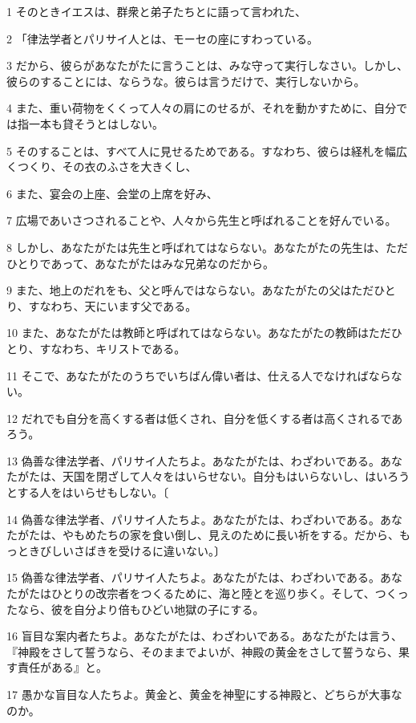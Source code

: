 \par 1 そのときイエスは、群衆と弟子たちとに語って言われた、
\par 2 「律法学者とパリサイ人とは、モーセの座にすわっている。
\par 3 だから、彼らがあなたがたに言うことは、みな守って実行しなさい。しかし、彼らのすることには、ならうな。彼らは言うだけで、実行しないから。
\par 4 また、重い荷物をくくって人々の肩にのせるが、それを動かすために、自分では指一本も貸そうとはしない。
\par 5 そのすることは、すべて人に見せるためである。すなわち、彼らは経札を幅広くつくり、その衣のふさを大きくし、
\par 6 また、宴会の上座、会堂の上席を好み、
\par 7 広場であいさつされることや、人々から先生と呼ばれることを好んでいる。
\par 8 しかし、あなたがたは先生と呼ばれてはならない。あなたがたの先生は、ただひとりであって、あなたがたはみな兄弟なのだから。
\par 9 また、地上のだれをも、父と呼んではならない。あなたがたの父はただひとり、すなわち、天にいます父である。
\par 10 また、あなたがたは教師と呼ばれてはならない。あなたがたの教師はただひとり、すなわち、キリストである。
\par 11 そこで、あなたがたのうちでいちばん偉い者は、仕える人でなければならない。
\par 12 だれでも自分を高くする者は低くされ、自分を低くする者は高くされるであろう。
\par 13 偽善な律法学者、パリサイ人たちよ。あなたがたは、わざわいである。あなたがたは、天国を閉ざして人々をはいらせない。自分もはいらないし、はいろうとする人をはいらせもしない。〔
\par 14 偽善な律法学者、パリサイ人たちよ。あなたがたは、わざわいである。あなたがたは、やもめたちの家を食い倒し、見えのために長い祈をする。だから、もっときびしいさばきを受けるに違いない。〕
\par 15 偽善な律法学者、パリサイ人たちよ。あなたがたは、わざわいである。あなたがたはひとりの改宗者をつくるために、海と陸とを巡り歩く。そして、つくったなら、彼を自分より倍もひどい地獄の子にする。
\par 16 盲目な案内者たちよ。あなたがたは、わざわいである。あなたがたは言う、『神殿をさして誓うなら、そのままでよいが、神殿の黄金をさして誓うなら、果す責任がある』と。
\par 17 愚かな盲目な人たちよ。黄金と、黄金を神聖にする神殿と、どちらが大事なのか。
